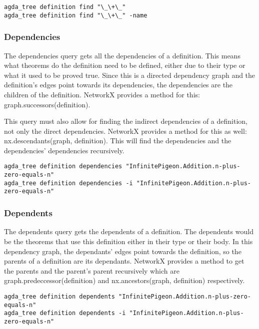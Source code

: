 \begin{lstlisting}
agda_tree definition find "\_\+\_"
agda_tree definition find "\_\+\_" -name
\end{lstlisting}

\subsubsection{Dependencies}

The dependencies query gets all the dependencies of a definition. This means what
theorems do the definition need to be defined, either due to their type or what
it used to be proved true. Since this is a directed dependency graph and the
definition's edges point towards its dependencies, the dependencies are the
children of the definition. NetworkX provides a method for this: \linebreak \textsf{graph.successors(definition)}.

This query must also allow for finding the indirect dependencies of a
definition, not only the direct dependencies. NetworkX provides a method for
this as well: \textsf{nx.descendants(graph, definition)}. This will find the
dependencies and the dependencies' dependencies recursively.

\begin{lstlisting}
agda_tree definition dependencies "InfinitePigeon.Addition.n-plus-zero-equals-n"
agda_tree definition dependencies -i "InfinitePigeon.Addition.n-plus-zero-equals-n"
\end{lstlisting}

\subsubsection{Dependents}

The dependents query gets the dependents of a definition. The dependents would
be the theorems that use this definition either in their type or their body. In
this dependency graph, the dependants' edges point towards the definition, so
the parents of a definition are its dependants. NetworkX provides a method to
get the parents and the parent's parent recursively which are
\textsf{graph.predeccessor(definition)} and \textsf{nx.ancestors(graph,
definition)} respectively.

\begin{lstlisting}
agda_tree definition dependents "InfinitePigeon.Addition.n-plus-zero-equals-n"
agda_tree definition dependents -i "InfinitePigeon.Addition.n-plus-zero-equals-n"
\end{lstlisting}

